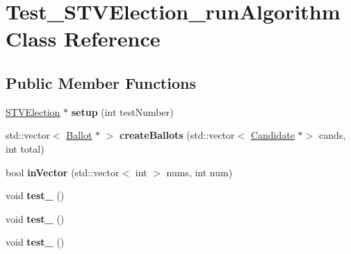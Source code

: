 \hypertarget{classTest__STVElection__runAlgorithm}{}\section{Test\+\_\+\+S\+T\+V\+Election\+\_\+run\+Algorithm Class Reference}
\label{classTest__STVElection__runAlgorithm}
\subsection*{Public Member Functions}
\begin{DoxyCompactItemize}
\item 
\mbox{\label{classTest__STVElection__runAlgorithm_ae0d0eff50a4cd0c8771d67e2ba94a71a}} 
\hyperlink{classSTVElection}{S\+T\+V\+Election} $\ast$ {\bfseries setup} (int test\+Number)
\item 
\mbox{\label{classTest__STVElection__runAlgorithm_a2c6cd68c8373db75297df5eb692bb35d}} 
std\+::vector$<$ \hyperlink{classBallot}{Ballot} $\ast$ $>$ {\bfseries create\+Ballots} (std\+::vector$<$ \hyperlink{classCandidate}{Candidate} $\ast$$>$ cands, int total)
\item 
\mbox{\label{classTest__STVElection__runAlgorithm_aeb90bdc2db3d0d01020df9e8ef2ed75f}} 
bool {\bfseries in\+Vector} (std\+::vector$<$ int $>$ nums, int num)
\item 
\mbox{\label{classTest__STVElection__runAlgorithm_aead5f6f1ef98541956b2e792987dd280}} 
void {\bfseries test\+\_} ()
\item 
\mbox{\label{classTest__STVElection__runAlgorithm_a0ea1244d46d9d9e1ebc2aa449d4d5d7d}} 
void {\bfseries test\+\_} ()
\item 
\mbox{\label{classTest__STVElection__runAlgorithm_a583e0d8f443e0f9f09e7dda019c2e833}} 
void {\bfseries test\+\_} ()
\item 
\mbox{\label{classTest__STVElection__runAlgorithm_aeb70bc82fc16aae4efb817c63d46e322}} 
$$
\end{DoxyCompactItemize}
